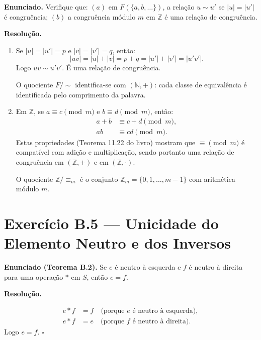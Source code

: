 \documentclass[12pt,a4paper]{article}
\begin{document}
\textbf{Enunciado.} Verifique que:
$(a)$ em $F(\{a,b,\ldots\})$, a relação $u \sim u'$ se $|u| = |u'|$ é congruência;
$(b)$ a congruência módulo $m$ em $\mathbb{Z}$ é uma relação de congruência.

\medskip
\textbf{Resolução.}

\begin{enumerate}[label=(\alph*)]
  \item Se $|u| = |u'| = p$ e $|v| = |v'| = q$, então:
        \[
          |uv| = |u| + |v| = p + q = |u'| + |v'| = |u'v'|.
        \]
        Logo $uv \sim u'v'$. É uma relação de congruência.

        O quociente $F/{\sim}$ identifica-se com $(\mathbb{N}, +)$: cada classe de
        equivalência é identificada pelo comprimento da palavra.

  \item Em $\mathbb{Z}$, se $a \equiv c \pmod{m}$ e $b \equiv d \pmod{m}$, então:
        \begin{align*}
          a + b &\equiv c + d \pmod{m},\\
          ab    &\equiv cd \pmod{m}.
        \end{align*}
        Estas propriedades (Teorema 11.22 do livro) mostram que $\equiv \pmod{m}$ é
        compatível com adição e multiplicação, sendo portanto uma relação de congruência
        em $(\mathbb{Z}, +)$ e em $(\mathbb{Z}, \cdot)$.

        O quociente $\mathbb{Z}/{\equiv_m}$ é o conjunto $\mathbb{Z}_m = \{0, 1, \ldots, m-1\}$
        com aritmética módulo $m$.
\end{enumerate}

\section*{Exercício B.5 — Unicidade do Elemento Neutro e dos Inversos}

\textbf{Enunciado (Teorema B.2).} Se $e$ é neutro à esquerda e $f$ é neutro à direita
para uma operação $*$ em $S$, então $e = f$.

\medskip
\textbf{Resolução.}

\begin{align*}
  e * f &= f \quad\text{(porque } e \text{ é neutro à esquerda)},\\
  e * f &= e \quad\text{(porque } f \text{ é neutro à direita)}.
\end{align*}
Logo $e = f$. $\square$
\end{document}
